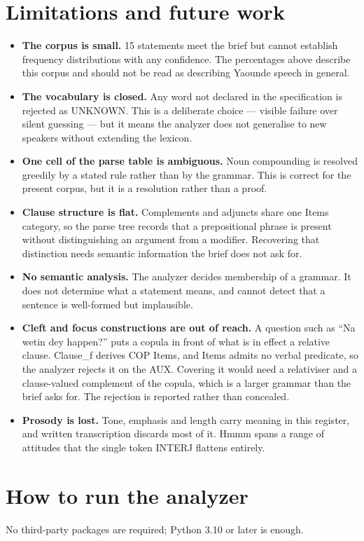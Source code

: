 \documentclass[11pt,a4paper]{article}
\begin{document}
\section{Limitations and future work}
\label{sec:limitations-and-future-work}
\begin{itemize}
\item \textbf{The corpus is small.} 15 statements meet the brief but cannot establish frequency distributions with any confidence. The percentages above describe this corpus and should not be read as describing Yaounde speech in general.
\item \textbf{The vocabulary is closed.} Any word not declared in the specification is rejected as UNKNOWN. This is a deliberate choice --- visible failure over silent guessing --- but it means the analyzer does not generalise to new speakers without extending the lexicon.
\item \textbf{One cell of the parse table is ambiguous.} Noun compounding is resolved greedily by a stated rule rather than by the grammar. This is correct for the present corpus, but it is a resolution rather than a proof.
\item \textbf{Clause structure is flat.} Complements and adjuncts share one Items category, so the parse tree records that a prepositional phrase is present without distinguishing an argument from a modifier. Recovering that distinction needs semantic information the brief does not ask for.
\item \textbf{No semantic analysis.} The analyzer decides membership of a grammar. It does not determine what a statement means, and cannot detect that a sentence is well-formed but implausible.
\item \textbf{Cleft and focus constructions are out of reach.} A question such as ``Na wetin dey happen?'' puts a copula in front of what is in effect a relative clause. Clause\_f derives COP Items, and Items admits no verbal predicate, so the analyzer rejects it on the AUX. Covering it would need a relativiser and a clause-valued complement of the copula, which is a larger grammar than the brief asks for. The rejection is reported rather than concealed.
\item \textbf{Prosody is lost.} Tone, emphasis and length carry meaning in this register, and written transcription discards most of it. Hmmm spans a range of attitudes that the single token INTERJ flattens entirely.
\end{itemize}

\section{How to run the analyzer}
\label{sec:how-to-run-the-analyzer}
No third-party packages are required; Python 3.10 or later is enough.
\end{document}
